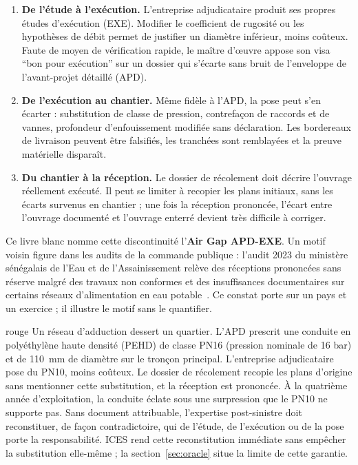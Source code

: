 \documentclass[11pt,a4paper]{article}
\begin{document}
\begin{enumerate}
  \item \textbf{De l'étude à l'exécution.} L'entreprise adjudicataire produit ses propres études d'exécution (EXE). Modifier le coefficient de rugosité ou les hypothèses de débit permet de justifier un diamètre inférieur, moins coûteux. Faute de moyen de vérification rapide, le maître d'œuvre appose son visa \enquote{bon pour exécution} sur un dossier qui s'écarte sans bruit de l'enveloppe de l'avant-projet détaillé (APD).
  \item \textbf{De l'exécution au chantier.} Même fidèle à l'APD, la pose peut s'en écarter : substitution de classe de pression, contrefaçon de raccords et de vannes, profondeur d'enfouissement modifiée sans déclaration. Les bordereaux de livraison peuvent être falsifiés, les tranchées sont remblayées et la preuve matérielle disparaît.
  \item \textbf{Du chantier à la réception.} Le dossier de récolement doit décrire l'ouvrage réellement exécuté. Il peut se limiter à recopier les plans initiaux, sans les écarts survenus en chantier ; une fois la réception prononcée, l'écart entre l'ouvrage documenté et l'ouvrage enterré devient très difficile à corriger.
\end{enumerate}

Ce livre blanc nomme cette discontinuité l'\textbf{Air Gap APD-EXE}. Un motif voisin figure dans les audits de la commande publique : l'audit 2023 du ministère sénégalais de l'Eau et de l'Assainissement relève des réceptions prononcées sans réserve malgré des travaux non conformes et des insuffisances documentaires sur certains réseaux d'alimentation en eau potable~\cite{arcop_senegal_2024}. Ce constat porte sur un pays et un exercice ; il illustre le motif sans le quantifier.

\begin{icesbox}{rouge}
Un réseau d'adduction dessert un quartier. L'APD prescrit une conduite en polyéthylène haute densité (PEHD) de classe PN16 (pression nominale de 16 bar) et de 110~mm de diamètre sur le tronçon principal. L'entreprise adjudicataire pose du PN10, moins coûteux. Le dossier de récolement recopie les plans d'origine sans mentionner cette substitution, et la réception est prononcée. À la quatrième année d'exploitation, la conduite éclate sous une surpression que le PN10 ne supporte pas. Sans document attribuable, l'expertise post-sinistre doit reconstituer, de façon contradictoire, qui de l'étude, de l'exécution ou de la pose porte la responsabilité. ICES rend cette reconstitution immédiate sans empêcher la substitution elle-même ; la section~\ref{sec:oracle} situe la limite de cette garantie.
\end{icesbox}
\end{document}
